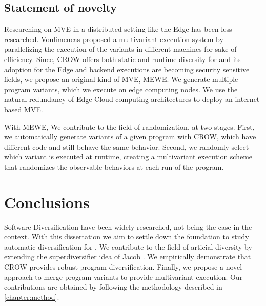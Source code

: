
%



\subsection*{Statement of novelty}
\label{sota:contribs}



Researching on MVE in a distributed setting like the Edge \citationneeded has been less researched. Voulimeneas \etal proposed a multivariant execution system by parallelizing the execution of the variants in different machines \cite{voulimeneas2021dmvx} for sake of efficiency. Since, CROW offers both static and runtime diversity for \wasm and its adoption for the Edge and backend executions are becoming security sensitive fields, we propose an original kind of MVE, MEWE. We generate multiple program variants, which we execute on edge computing nodes. We use the natural redundancy of Edge-Cloud computing architectures to deploy an internet-based MVE.

With MEWE, We contribute to the field of randomization, at two stages. First, we automatically generate variants of a given program with CROW, which have different \wasm code and still behave the same behavior. Second, we randomly select which variant is executed at runtime, creating a multivariant execution scheme that randomizes the observable behaviors at each run of the program.


\section{Conclusions}
\label{sota:conclusions}

Software Diversification have been widely researched, not being the case in the \wasm context. With this dissertation we aim to settle down the foundation to study automatic diversification for \wasm. We contribute to the field of articial diversity by extending the superdiversifier idea of Jacob \etal \cite{jacob2008superdiversifier}. We empirically demonstrate that CROW provides robust program diversification. Finally, we propose a novel approach to merge program variants to provide multivariant execution.  Our
contributions are obtained by following the methodology described in \autoref{chapter:method}. 

